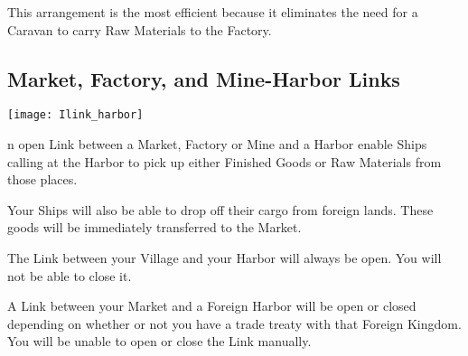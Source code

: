 This arrangement is the most efficient because it eliminates the need for a Caravan to carry Raw Materials to the Factory.

\clearpage

\subsection{Market, Factory, and Mine-Harbor Links}


\begin{center}
	\texttt{[image: Ilink\_harbor]} %
\end{center}

n open Link between a Market, Factory or Mine and a Harbor enable Ships calling at the Harbor to pick up either Finished Goods or Raw Materials from those places.

Your Ships will also be able to drop off their cargo from foreign lands. These goods will be immediately transferred to the Market.

The Link between your Village and your Harbor will always be open. You will not be able to close it.

A Link between your Market and a Foreign Harbor will be open or closed depending on whether or not you have a trade treaty with that Foreign Kingdom. You will be unable to open or close the Link manually.
